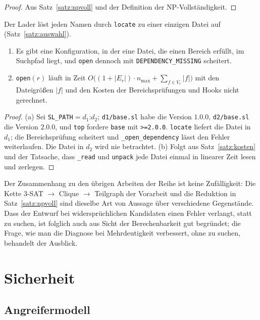 \begin{proof}
	Aus Satz~\ref{satz:npvoll} und der Definition der NP-Vollständigkeit.
\end{proof}

\begin{satz}
	\label{satz:unvollstaendig}
	Der Lader löst jeden Namen durch \texttt{locate} zu einer einzigen Datei auf (Satz~\ref{satz:auswahl}).
	\begin{enumerate}[label=(\alph*)]
		\item Es gibt eine Konfiguration, in der eine Datei, die einen Bereich erfüllt, im Suchpfad liegt, und \texttt{open} dennoch mit \texttt{DEPENDENCY\_MISSING} scheitert.
		\item \texttt{open}$(r)$ läuft in Zeit $O\bigl((1+|E_r|)\cdot n_{\max}+\sum_{f\in V_r}|f|\bigr)$ mit den Dateigrößen $|f|$ und den Kosten der Bereichsprüfungen und Hooks nicht gerechnet.
	\end{enumerate}
\end{satz}

\begin{proof}
	(a) Sei \texttt{SL\_PATH}$=d_1\texttt{:}d_2$; \texttt{d1/base.sl} habe die Version $1.0.0$, \texttt{d2/base.sl} die Version $2.0.0$, und \texttt{top} fordere \texttt{base} mit \texttt{>=2.0.0}. \texttt{locate} liefert die Datei in $d_1$; die Bereichsprüfung scheitert und \texttt{\_open\_dependency} lässt den Fehler weiterlaufen. Die Datei in $d_2$ wird nie betrachtet. (b) Folgt aus Satz~\ref{satz:kosten} und der Tatsache, dass \texttt{\_read} und \texttt{unpack} jede Datei einmal in linearer Zeit lesen und zerlegen.
\end{proof}

Der Zusammenhang zu den übrigen Arbeiten der Reihe ist keine Zufälligkeit: Die Kette 3-SAT $\to$ Clique $\to$ Teilgraph der Vorarbeit und die Reduktion in Satz~\ref{satz:npvoll} sind dieselbe Art von Aussage über verschiedene Gegenstände. Dass der Entwurf bei widersprüchlichen Kandidaten einen Fehler verlangt, statt zu suchen, ist folglich auch aus Sicht der Berechenbarkeit gut begründet; die Frage, wie man die Diagnose bei Mehrdeutigkeit verbessert, ohne zu suchen, behandelt der Ausblick.

\chapter{Sicherheit}
\label{chap:sicherheit}

\section{Angreifermodell}

